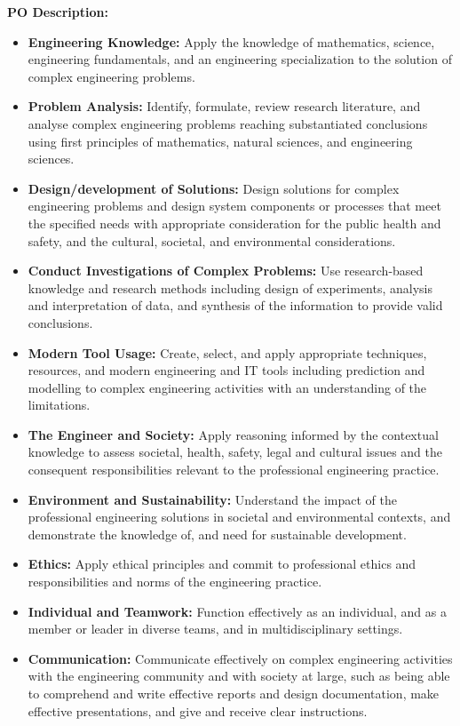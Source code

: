 \documentclass[12pt,a4paper]{report}
\begin{document}
\vspace{0.5cm}
\noindent
\textbf{PO Description:}
\begin{itemize}[leftmargin=1.5cm, label=PO\arabic*:]
    \setlength\itemsep{0.1em}
    \item \textbf{Engineering Knowledge:} Apply the knowledge of mathematics, science, engineering fundamentals, and an engineering specialization to the solution of complex engineering problems.
    \item \textbf{Problem Analysis:} Identify, formulate, review research literature, and analyse complex engineering problems reaching substantiated conclusions using first principles of mathematics, natural sciences, and engineering sciences.
    \item \textbf{Design/development of Solutions:} Design solutions for complex engineering problems and design system components or processes that meet the specified needs with appropriate consideration for the public health and safety, and the cultural, societal, and environmental considerations.
    \item \textbf{Conduct Investigations of Complex Problems:} Use research-based knowledge and research methods including design of experiments, analysis and interpretation of data, and synthesis of the information to provide valid conclusions.
    \item \textbf{Modern Tool Usage:} Create, select, and apply appropriate techniques, resources, and modern engineering and IT tools including prediction and modelling to complex engineering activities with an understanding of the limitations.
    \item \textbf{The Engineer and Society:} Apply reasoning informed by the contextual knowledge to assess societal, health, safety, legal and cultural issues and the consequent responsibilities relevant to the professional engineering practice.
    \item \textbf{Environment and Sustainability:} Understand the impact of the professional engineering solutions in societal and environmental contexts, and demonstrate the knowledge of, and need for sustainable development.
    \item \textbf{Ethics:} Apply ethical principles and commit to professional ethics and responsibilities and norms of the engineering practice.
    \item \textbf{Individual and Teamwork:} Function effectively as an individual, and as a member or leader in diverse teams, and in multidisciplinary settings.
    \item \textbf{Communication:} Communicate effectively on complex engineering activities with the engineering community and with society at large, such as being able to comprehend and write effective reports and design documentation, make effective presentations, and give and receive clear instructions.

\end{itemize}
\end{document}

